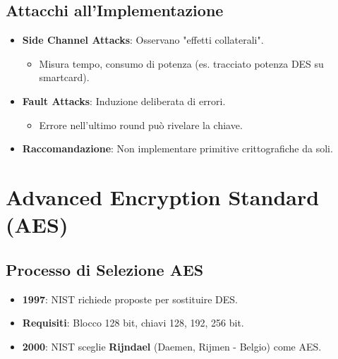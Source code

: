 \subsection{Attacchi all'Implementazione}
\begin{itemize}
    \item \textbf{Side Channel Attacks}: Osservano "effetti collaterali".
    \begin{itemize}
        \item Misura tempo, consumo di potenza (es. tracciato potenza DES su smartcard).
    \end{itemize}
    \item \textbf{Fault Attacks}: Induzione deliberata di errori.
    \begin{itemize}
        \item Errore nell'ultimo round può rivelare la chiave.
    \end{itemize}
    \item \textbf{Raccomandazione}: Non implementare primitive crittografiche da soli.
\end{itemize}

\section{Advanced Encryption Standard (AES)}

\subsection{Processo di Selezione AES}
\begin{itemize}
    \item \textbf{1997}: NIST richiede proposte per sostituire DES.
    \item \textbf{Requisiti}: Blocco 128 bit, chiavi 128, 192, 256 bit.
    \item \textbf{2000}: NIST sceglie \textbf{Rijndael} (Daemen, Rijmen - Belgio) come AES.
\end{itemize}


